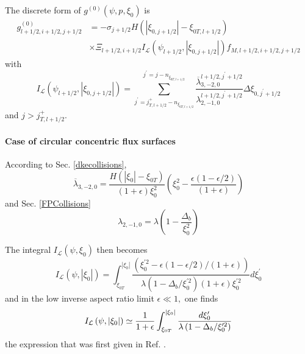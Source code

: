 The discrete form of $g^{(0)}\left( \psi ,p,\xi _{0}\right) $ is
\begin{align}
g_{l+1/2,i+1/2,j+1/2}^{(0)}&=-\sigma _{j+1/2}H\left( \left| \xi
_{0,j+1/2}\right| -\xi _{0T,l+1/2}\right) \nonumber\\&\times\Xi _{l+1/2,i+1/2}I_{\mathcal{L}%
}\left( \psi _{l+1/2},\left| \xi _{0,j+1/2}\right| \right)
f_{M,l+1/2,i+1/2,j+1/2}
\end{align}
with
\begin{equation}
I_{\mathcal{L}}\left( \psi _{l+1/2},\left| \xi _{0,j+1/2}\right| \right)
=\sum_{j^{\prime }=j_{T,l+1/2}^{+}-n_{\xi _{0T,l+1/2}}}^{j^{\prime
}=j-n_{\xi _{0T,l+1/2}}}\frac{\overline{\lambda }_{3,-2,0}^{l+1/2,j^{\prime
}+1/2}}{\lambda _{2,-1,0}^{l+1/2,j^{\prime }+1/2}}\Delta \xi _{0,j^{\prime
}+1/2}
\end{equation}
and $j>j_{T,l+1/2}^{+}.$

\paragraph{Case of circular concentric flux surfaces}

According to Sec. \ref{dkecollisions},
\begin{equation}
\overline{\lambda }_{3,-2,0}=\frac{H(|\xi _{0}|-\xi _{0T})}{\left(
1+\epsilon \right) \xi _{0}^{2}}\left( \xi _{0}^{2}-\frac{\epsilon \left(
1-\epsilon /2\right) }{\left( 1+\epsilon \right) }\right)
\end{equation}
and Sec. \ref{FPCollisions}
\begin{equation}
\lambda _{2,-1,0}=\lambda \left( 1-\frac{\Delta _{b}}{\xi _{0}^{2}}\right)
\end{equation}

The integral $I_{\mathcal{L}}\left( \psi ,\xi _{0}\right) $ then becomes
\begin{equation}
I_{\mathcal{L}}\left( \psi ,\left| \xi _{0}\right| \right) =\int_{\xi
_{0T}}^{\left| \xi _{0}\right| }\frac{\left( \xi _{0}^{\prime 2}-\epsilon
\left( 1-\epsilon /2\right) /\left( 1+\epsilon \right) \right) }{\lambda
\left( 1-\Delta _{b}/\xi _{0}^{\prime 2}\right) \left( 1+\epsilon \right)
\xi _{0}^{\prime 2}}d\xi _{0}^{\prime }
\end{equation}
and in the low inverse aspect ratio limit $\epsilon \ll 1,$ one finds
\begin{equation}
I_{\mathcal{L}}\left( \psi ,\left| \xi _{0}\right| \right) \simeq \frac{1}{%
1+\epsilon }\int_{\xi _{0T}}^{\left| \xi _{0}\right| }\frac{d\xi
_{0}^{\prime }}{\lambda \left( 1-\Delta _{b}/\xi _{0}^{\prime 2}\right) }
\end{equation}
the expression that was first given in Ref. \cite{sch99}.

